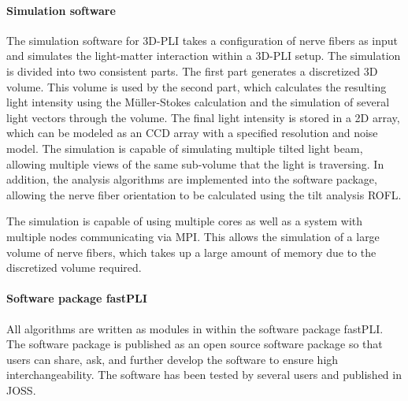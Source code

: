 \paragraph{Simulation software}
% 
The simulation software for \ac{3D-PLI} takes a configuration of nerve fibers as input and simulates the light-matter interaction within a \ac{3D-PLI} setup.
The simulation is divided into two consistent parts.
The first part generates a discretized 3D volume.
This volume is used by the second part, which calculates the resulting light intensity using the M\"{u}ller-Stokes calculation and the simulation of several light vectors through the volume.
The final light intensity is stored in a 2D array, which can be modeled as an \ac{CCD} array with a specified resolution and noise model.
The simulation is capable of simulating multiple tilted light beam, allowing multiple views of the same sub-volume that the light is traversing.
In addition, the analysis algorithms are implemented into the software package, allowing the nerve fiber orientation to be calculated using the tilt analysis \ac{ROFL}.
\par
% 
The simulation is capable of using multiple cores as well as a system with multiple nodes communicating via \ac{MPI}.
This allows the simulation of a large volume of nerve fibers, which takes up a large amount of memory due to the discretized volume required.
% 
% 
% 
\paragraph{Software package \acs{fastPLI}}
% 
All algorithms are written as modules in \python{} within the software package \ac{fastPLI}.
The software package is published as an open source software package so that users can share, ask, and further develop the software to ensure high interchangeability. 
The software has been tested by several users and published in \ac{JOSS}.
% 
% 
% 
